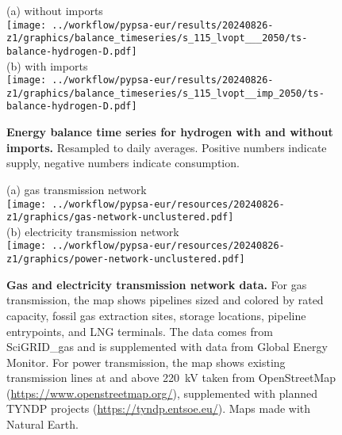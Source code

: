 \begin{figure*}
    \centering
    \footnotesize
    (a) without imports \\
    \texttt{[image: ../workflow/pypsa-eur/results/20240826-z1/graphics/balance\_timeseries/s\_115\_lvopt\_\_\_2050/ts-balance-hydrogen-D.pdf]} \\
    (b) with imports \\
    \texttt{[image: ../workflow/pypsa-eur/results/20240826-z1/graphics/balance\_timeseries/s\_115\_lvopt\_\_imp\_2050/ts-balance-hydrogen-D.pdf]}
    \caption{\textbf{Energy balance time series for hydrogen with and without imports.} Resampled to daily averages. Positive numbers indicate supply, negative numbers indicate consumption.}
    \label{fig:si:balance-h2}
\end{figure*}

\begin{figure*}
    \centering
    \footnotesize
    (a) gas transmission network \\
    \texttt{[image: ../workflow/pypsa-eur/resources/20240826-z1/graphics/gas-network-unclustered.pdf]} \\
    (b) electricity transmission network \\
    \texttt{[image: ../workflow/pypsa-eur/resources/20240826-z1/graphics/power-network-unclustered.pdf]}
    \caption{\textbf{Gas and electricity transmission network data.} For gas
    transmission, the map shows pipelines sized and colored by rated capacity,
    fossil gas extraction sites, storage locations, pipeline entrypoints, and
    LNG terminals. The data comes from SciGRID\_gas and is supplemented with
    data from Global Energy Monitor. For power transmission, the map shows
    existing transmission lines at and above 220~kV taken from OpenStreetMap (\url{https://www.openstreetmap.org/}),
    supplemented with planned TYNDP projects (\url{https://tyndp.entsoe.eu/}). Maps made with Natural Earth.}
    \label{fig:si:networks-raw}
\end{figure*}

